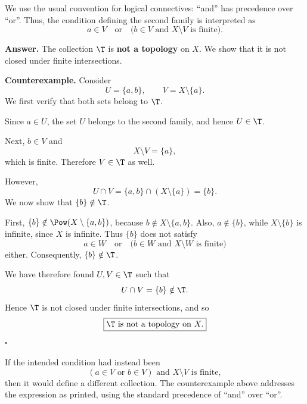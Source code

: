 
We use the usual convention for logical connectives: ``and'' has precedence over ``or''. Thus,
the condition defining the second family is interpreted as
\[ a\in V\quad\text{or}\quad\bigl(b\in V\text{ and }X\setminus V\text{ is finite}\bigr). \]

\textbf{Answer.} The collection $\T$ is \textbf{not a topology} on $X$. We show that it is not
closed under finite intersections.

\textbf{Counterexample.} Consider
\[ U=\{a,b\},\qquad V=X\setminus\{a\}. \]
We first verify that both sets belong to $\T$.

Since $a\in U$, the set $U$ belongs to the second family, and hence $U\in\T$.

Next, $b\in V$ and
\[ X\setminus V=\{a\}, \]
which is finite. Therefore $V\in\T$ as well.

However,
\[ U\cap V=\{a,b\}\cap(X\setminus\{a\})=\{b\}. \]
We now show that $\{b\}\notin\T$.

First, $\{b\}\notin\Pow(X\setminus\{a,b\})$, because $b\notin X\setminus\{a,b\}$. Also,
$a\notin\{b\}$, while $X\setminus\{b\}$ is infinite, since $X$ is infinite. Thus $\{b\}$ does
not satisfy
\[ a\in W\quad\text{or}\quad\bigl(b\in W\text{ and }X\setminus W\text{ is finite}\bigr) \]
either. Consequently, $\{b\}\notin\T$.

We have therefore found $U,V\in\T$ such that
\[ U\cap V=\{b\}\notin\T. \]
Hence $\T$ is not closed under finite intersections, and so
\[ \boxed{\T\text{ is not a topology on }X.} \]
\hfill$\square$

\begin{remark}
If the intended condition had instead been
\[ (a\in V\text{ or }b\in V)\text{ and }X\setminus V\text{ is finite}, \]
then it would define a different collection. The counterexample above addresses the expression
as printed, using the standard precedence of ``and'' over ``or''.
\end{remark}
